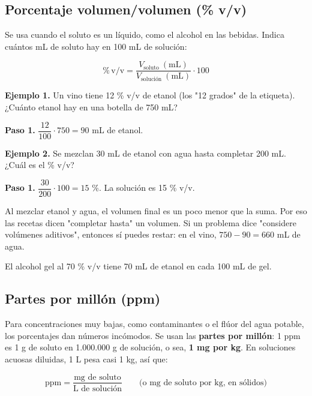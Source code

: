 \subsection{Porcentaje volumen/volumen (\% v/v)}
Se usa cuando el soluto es un líquido, como el alcohol en las bebidas. Indica cuántos mL de soluto hay en 100 mL de solución:

 \[ \%\,\text{v/v} = \dfrac{V_{\text{soluto}}\ (\text{mL})}{V_{\text{solución}}\ (\text{mL})}\cdot 100 \] 

\textbf{Ejemplo 1.} Un vino tiene 12 \% v/v de etanol (los "12 grados" de la etiqueta). ¿Cuánto etanol hay en una botella de 750 mL?

 

\textbf{Paso 1.} $\dfrac{12}{100}\cdot 750 = 90$ mL de etanol.

 

\textbf{Ejemplo 2.} Se mezclan 30 mL de etanol con agua hasta completar 200 mL. ¿Cuál es el \% v/v?

 

\textbf{Paso 1.} $\dfrac{30}{200}\cdot 100 = 15$ \%. La solución es 15 \% v/v.

  
\begin{ojo} Al mezclar etanol y agua, el volumen final es un poco menor que la suma. Por eso las recetas dicen "completar hasta" un volumen. Si un problema dice "considere volúmenes aditivos", entonces sí puedes restar: en el vino, $750 - 90 = 660$ mL de agua.\end{ojo}
 
\begin{ejemplo} El alcohol gel al 70 \% v/v tiene 70 mL de etanol en cada 100 mL de gel.\end{ejemplo}
\subsection{Partes por millón (ppm)}
Para concentraciones muy bajas, como contaminantes o el flúor del agua potable, los porcentajes dan números incómodos. Se usan las \textbf{partes por millón}: 1 ppm es 1 g de soluto en 1.000.000 g de solución, o sea, \textbf{1 mg por kg}. En soluciones acuosas diluidas, 1 L pesa casi 1 kg, así que:

 \[ \text{ppm} = \dfrac{\text{mg de soluto}}{\text{L de solución}} \qquad \text{(o mg de soluto por kg, en sólidos)} \] 

